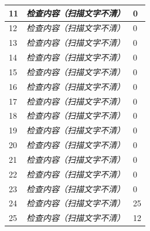 \documentclass[UTF8,10pt,a4paper,fontset=fandol]{ctexart}
\newcommand{\fieldvalue}[1]{#1}
\newcommand{\handwritten}[1]{#1}
\begin{document}
\begin{tabularx}{\textwidth}{|l|X|l|}
\hline
11 & \textit{检查内容（扫描文字不清）} &
\fieldvalue{\handwritten{0}}\\
\hline
12 & \textit{检查内容（扫描文字不清）} &
\fieldvalue{\handwritten{0}}\\
\hline
13 & \textit{检查内容（扫描文字不清）} &
\fieldvalue{\handwritten{0}}\\
\hline
14 & \textit{检查内容（扫描文字不清）} &
\fieldvalue{\handwritten{0}}\\
\hline
15 & \textit{检查内容（扫描文字不清）} &
\fieldvalue{\handwritten{0}}\\
\hline
16 & \textit{检查内容（扫描文字不清）} &
\fieldvalue{\handwritten{0}}\\
\hline
17 & \textit{检查内容（扫描文字不清）} &
\fieldvalue{\handwritten{0}}\\
\hline
18 & \textit{检查内容（扫描文字不清）} &
\fieldvalue{\handwritten{0}}\\
\hline
19 & \textit{检查内容（扫描文字不清）} &
\fieldvalue{\handwritten{0}}\\
\hline
20 & \textit{检查内容（扫描文字不清）} &
\fieldvalue{\handwritten{0}}\\
\hline
21 & \textit{检查内容（扫描文字不清）} &
\fieldvalue{\handwritten{0}}\\
\hline
22 & \textit{检查内容（扫描文字不清）} &
\fieldvalue{\handwritten{0}}\\
\hline
23 & \textit{检查内容（扫描文字不清）} &
\fieldvalue{\handwritten{0}}\\
\hline
24 & \textit{检查内容（扫描文字不清）} &
\fieldvalue{\handwritten{25}}\\
\hline
25 & \textit{检查内容（扫描文字不清）} &
\fieldvalue{\handwritten{12}}\\
\hline
\end{tabularx}
\end{document}
